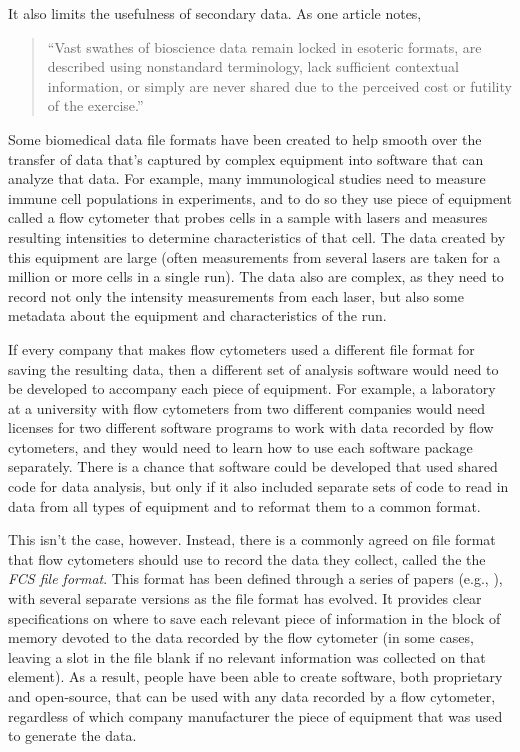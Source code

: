 \documentclass[]{tufte-book}
\begin{document}
It also limits the usefulness of secondary data. As one article notes,

\begin{quote}
``Vast swathes of bioscience data remain locked in esoteric formats, are
described using nonstandard terminology, lack sufficient contextual information,
or simply are never shared due to the perceived cost or futility of the
exercise.'' \citep{sansone2012toward}
\end{quote}

Some biomedical data file formats have been created to help smooth over the
transfer of data that's captured by complex equipment into software that can
analyze that data. For example, many immunological studies need to measure
immune cell populations in experiments, and to do so they use piece of equipment
called a flow cytometer that probes cells in a sample with lasers and measures
resulting intensities to determine characteristics of that cell. The data
created by this equipment are large (often measurements from several lasers are
taken for a million or more cells in a single run). The data also are complex, as
they need to record not only the intensity measurements from each laser, but
also some metadata about the equipment and characteristics of the run.

If every company that makes flow cytometers used a different file format for
saving the resulting data, then a different set of analysis software would need
to be developed to accompany each piece of equipment. For example, a laboratory
at a university with flow cytometers from two different companies would need
licenses for two different software programs to work with data recorded by flow
cytometers, and they would need to learn how to use each software package
separately. There is a chance that software could be developed that used shared
code for data analysis, but only if it also included separate sets of code to
read in data from all types of equipment and to reformat them to a common
format.

This isn't the case, however. Instead, there is a commonly agreed on file format
that flow cytometers should use to record the data they collect, called the the
\emph{FCS file format}. This format has been defined through a series of papers
(e.g., \citep{spidlen2021data}), with several separate versions as the file format
has evolved. It provides clear specifications on where to save each relevant
piece of information in the block of memory devoted to the data recorded by the
flow cytometer (in some cases, leaving a slot in the file blank if no relevant
information was collected on that element). As a result, people have been able
to create software, both proprietary and open-source, that can be used with any
data recorded by a flow cytometer, regardless of which company manufacturer the
piece of equipment that was used to generate the data.
\end{document}
